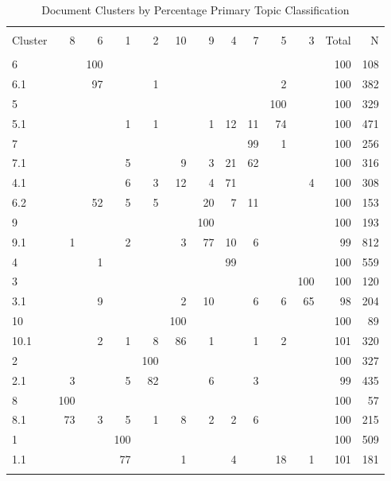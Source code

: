 \documentclass[]{book}
\theoremstyle{definition}
\theoremstyle{definition}
\theoremstyle{definition}
\theoremstyle{remark}
\begin{document}
\begin{table}[!htbp] \centering 
  \caption{Document Clusters by Percentage Primary Topic Classification} 
  \label{tab:hottable} 
\begin{tabular}{@{\extracolsep{5pt}} lrrrrrrrrrrrr} 
\\[-1.8ex]\hline 
\hline \\[-1.8ex] 
Cluster & 8 & 6 & 1 & 2 & 10 & 9 & 4 & 7 & 5 & 3 & Total & N \\ 
\hline \\[-1.8ex] 
6 &  & 100 &  &  &  &  &  &  &  &  & 100 & 108 \\ 
6.1 &  & 97 &  & 1 &  &  &  &  & 2 &  & 100 & 382 \\ 
5 &  &  &  &  &  &  &  &  & 100 &  & 100 & 329 \\ 
5.1 &  &  & 1 & 1 &  & 1 & 12 & 11 & 74 &  & 100 & 471 \\ 
7 &  &  &  &  &  &  &  & 99 & 1 &  & 100 & 256 \\ 
7.1 &  &  & 5 &  & 9 & 3 & 21 & 62 &  &  & 100 & 316 \\ 
4.1 &  &  & 6 & 3 & 12 & 4 & 71 &  &  & 4 & 100 & 308 \\ 
6.2 &  & 52 & 5 & 5 &  & 20 & 7 & 11 &  &  & 100 & 153 \\ 
9 &  &  &  &  &  & 100 &  &  &  &  & 100 & 193 \\ 
9.1 & 1 &  & 2 &  & 3 & 77 & 10 & 6 &  &  & 99 & 812 \\ 
4 &  & 1 &  &  &  &  & 99 &  &  &  & 100 & 559 \\ 
3 &  &  &  &  &  &  &  &  &  & 100 & 100 & 120 \\ 
3.1 &  & 9 &  &  & 2 & 10 &  & 6 & 6 & 65 & 98 & 204 \\ 
10 &  &  &  &  & 100 &  &  &  &  &  & 100 & 89 \\ 
10.1 &  & 2 & 1 & 8 & 86 & 1 &  & 1 & 2 &  & 101 & 320 \\ 
2 &  &  &  & 100 &  &  &  &  &  &  & 100 & 327 \\ 
2.1 & 3 &  & 5 & 82 &  & 6 &  & 3 &  &  & 99 & 435 \\ 
8 & 100 &  &  &  &  &  &  &  &  &  & 100 & 57 \\ 
8.1 & 73 & 3 & 5 & 1 & 8 & 2 & 2 & 6 &  &  & 100 & 215 \\ 
1 &  &  & 100 &  &  &  &  &  &  &  & 100 & 509 \\ 
1.1 &  &  & 77 &  & 1 &  & 4 &  & 18 & 1 & 101 & 181 \\ 
\hline \\[-1.8ex] 
\end{tabular} 
\end{table}
\end{document}
